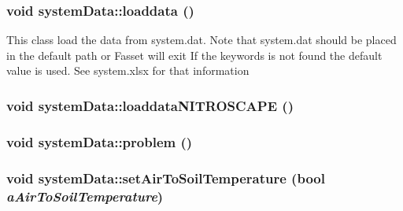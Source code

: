 \label{classsystem_data_aa5de73e3b5bbde326f30f19e2a21aa82}
\hypertarget{classsystem_data_af7488868863974a44e7a1e6fc21a7542}{
\subsubsection[{loaddata}]{\setlength{\rightskip}{0pt plus 5cm}void systemData::loaddata ()}}
\label{classsystem_data_af7488868863974a44e7a1e6fc21a7542}
This class load the data from system.dat. Note that system.dat should be placed in the default path or Fasset will exit If the keywords is not found the default value is used. See system.xlsx for that information \hypertarget{classsystem_data_a1723df5efc2439253e54e2c3804e999b}{
\subsubsection[{loaddataNITROSCAPE}]{\setlength{\rightskip}{0pt plus 5cm}void systemData::loaddataNITROSCAPE ()}}
\label{classsystem_data_a1723df5efc2439253e54e2c3804e999b}
\hypertarget{classsystem_data_ac67d97741ebf19dadc1e9b29995213b3}{
\subsubsection[{problem}]{\setlength{\rightskip}{0pt plus 5cm}void systemData::problem ()}}
\label{classsystem_data_ac67d97741ebf19dadc1e9b29995213b3}
\hypertarget{classsystem_data_ab7ae597dd9497fd07d8c6415949c91dd}{
\subsubsection[{setAirToSoilTemperature}]{\setlength{\rightskip}{0pt plus 5cm}void systemData::setAirToSoilTemperature (bool {\em aAirToSoilTemperature})}}
\label{classsystem_data_ab7ae597dd9497fd07d8c6415949c91dd}
